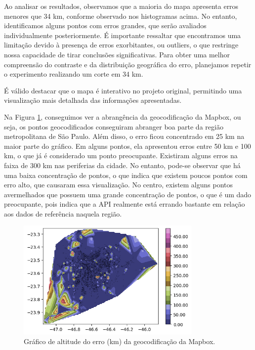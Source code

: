 Ao analisar os resultados, observamos que a maioria do mapa apresenta erros menores que 34 km, conforme observado nos histogramas acima. No entanto, identificamos alguns pontos com erros grandes, que serão avaliados individualmente posteriormente. É importante ressaltar que encontramos uma limitação devido à presença de erros exorbitantes, ou outliers, o que restringe nossa capacidade de tirar conclusões significativas. Para obter uma melhor compreensão do contraste e da distribuição geográfica do erro, planejamos repetir o experimento realizando um corte em 34 km.

É válido destacar que o mapa é interativo no projeto original, permitindo uma visualização mais detalhada das informações apresentadas.

Na Figura \ref{fig:grafAltM}, conseguimos ver a abrangência da geocodificação da Mapbox, ou seja, os pontos geocodificados conseguiram abranger boa parte da região metropolitana de São Paulo. Além disso, o erro ficou concentrado em 25 km na maior parte do gráfico. Em alguns pontos, ela apresentou erros entre 50 km e 100 km, o que já é considerado um ponto preocupante. Existiram alguns erros na faixa de 300 km nas periferias da cidade. No entanto, pode-se observar que há uma baixa concentração de pontos, o que indica que existem poucos pontos com erro alto, que causaram essa visualização. No centro, existem alguns pontos avermelhados que possuem uma grande concentração de pontos, o que é um dado preocupante, pois indica que a API realmente está errando bastante em relação aos dados de referência naquela região.

\begin{figure}[h] 
  \centering
  \includegraphics[width=0.8\textwidth]{Figuras/graficoAltPontosMapbox.png}
  \caption{Gráfico de altitude do erro (km) da geocodificação da Mapbox.}
  \label{fig:grafAltM}
\end{figure}

